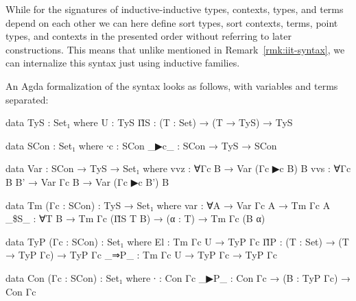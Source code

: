 \begin{remark}
While for the signatures of inductive-inductive types, contexts, types, and terms
depend on each other we can here define sort types, sort contexts, terms, point
types, and contexts in the presented order without referring to later constructions.
This means that unlike mentioned in Remark~\ref{rmk:iit-syntax}, we  can %
internalize this syntax just using inductive families.

An Agda formalization of the syntax looks as follows, with variables and terms
separated:
\begin{agdacode}
data TyS : Set₁ where
  U  : TyS
  Π̂S : (T : Set) → (T → TyS) → TyS

data SCon : Set₁ where
  ∙c   : SCon
  _▶c_ : SCon → TyS → SCon

data Var : SCon → TyS → Set₁ where
  vvz : ∀{Γc B} → Var (Γc ▶c B) B
  vvs : ∀{Γc B B'} → Var Γc B → Var (Γc ▶c B') B

data Tm (Γc : SCon) : TyS → Set₁ where
  var  : ∀{A} → Var Γc A → Tm Γc A
  _\$S_ : ∀{T B} → Tm Γc (Π̂S T B) → (α : T) → Tm Γc (B α)

data TyP (Γc : SCon) : Set₁ where
  El   : Tm Γc U → TyP Γc
  Π̂P   : (T : Set) → (T → TyP Γc) → TyP Γc
  _⇒P_ : Tm Γc U → TyP Γc → TyP Γc

data Con (Γc : SCon) : Set₁ where
  ∙    : Con Γc
  _▶P_ : Con Γc → (B : TyP Γc) → Con Γc
\end{agdacode}
\end{remark}

